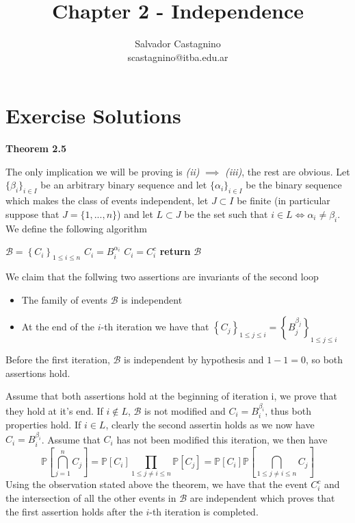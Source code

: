 \documentclass{article}
\author{Salvador Castagnino \\ scastagnino@itba.edu.ar}
\date{}
\title{Chapter 2 - Independence}
\begin{document}
\maketitle 

\section*{Exercise Solutions}

\begin{exercise}\textbf{Theorem 2.5}

	The only implication we will be proving is \textit{(ii)} $\implies$ \textit{(iii)}, the rest are obvious. Let $\{\beta_i\}_{i \in I}$ be an arbitrary binary sequence and let $\{\alpha_i\}_{i \in I}$ be the binary sequence which makes the class of events independent, let $J \subset I$ be finite (in particular suppose that $J = \{1,...,n\}$) and let $L \subset J$ be the set such that $i \in L \iff \alpha_i \neq \beta_i$. We define the following algorithm

	\bigbreak

	\begin{algorithmic}
		\State $\mathcal{B}=\left\{C_i\right\}_{1 \le i \le n}$
		\State $C_i = B_i^{\alpha_i}$
		\EndFor
		\State $C_i = C_i^c$
		\EndIf
		\EndFor
		\State \textbf{return} $\mathcal{B}$
	\end{algorithmic}

	\bigbreak

	We claim that the follwing two assertions are invariants of the second loop
	\begin{itemize}
		\item The family of events $\mathcal{B}$ is independent
		\item At the end of the $i$-th iteration we have that $\left\{C_j\right\}_{1 \le j \le i} = \left\{B_j^{\beta_j}\right\}_{1 \le j \le i}$
	\end{itemize}

	Before the first iteration, $\mathcal{B}$ is independent by hypothesis and $1-1=0$, so both assertions hold.

	Assume that both assertions hold at the beginning of iteration i, we prove that they hold at it's end. If $i \not\in L$, $\mathcal{B}$ is not modified and $C_i = B_i^{\beta_i}$, thus both properties hold. If $i \in L$, clearly the second assertin holds as we now have $C_i = B_i^{\beta_i}$. Assume that $C_i$ has not been modified this iteration, we then have
	\[
		\mathbb{P}\left[\bigcap_{j = 1}^n C_j \right] = \mathbb{P}\left[C_i\right] \prod_{1 \le j \neq i \le n} \mathbb{P}\left[C_j\right] = 
		\mathbb{P}\left[C_i\right] \mathbb{P}\left[\bigcap_{1 \le j \neq i \le n}C_j\right]
	\]
	Using the observation stated above the theorem, we have that the event $C_i^c$ and the intersection of all the other events in $\mathcal{B}$ are independent which proves that the first assertion holds after the $i$-th iteration is completed.


\end{exercise}
\end{document}
